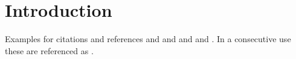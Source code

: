 \documentclass[10pt]{IEEEtran}
\begin{document}
\section{Introduction}
Examples for citations and references \cite{Firstman:2014:Approach} and \cite{Firstman:2013:Ongoing}
and \cite{Webpage:2014:Somewebpage}
and \cite{Bookman:2014:Somebook} and \cite{Chapman:2014:Starting}.
In a consecutive use these are referenced as
\cite{Firstman:2014:Approach,Firstman:2013:Ongoing,Webpage:2014:Somewebpage,Bookman:2014:Somebook,Chapman:2014:Starting}.



\end{document}
